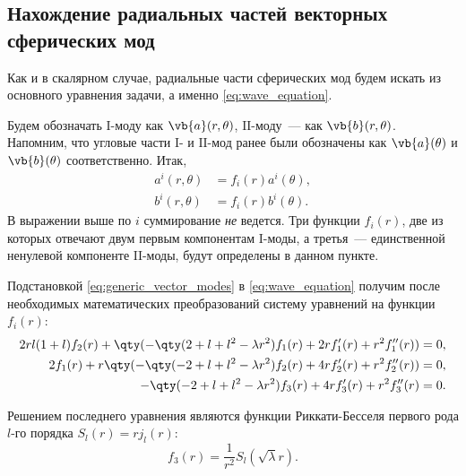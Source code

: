 %
%
%
%
%
%

\subsection{Нахождение радиальных частей векторных сферических мод}

    Как и в скалярном случае, радиальные части сферических мод будем искать из основного уравнения задачи, а именно \autoref{eq:wave_equation}.

    Будем обозначать $\mathrm{I}$-моду как $\vb{a}(r,\theta)$, $\mathrm{II}$-моду~--- как $\vb{b}(r,\theta)$. Напомним, что угловые части $\mathrm{I}$- и $\mathrm{II}$-мод ранее были обозначены как $\vb{a}(\theta)$ и $\vb{b}(\theta)$ соответственно. Итак,
    \begin{equation}\begin{aligned}\label{eq:generic_vector_modes}
        a^i(r,\theta) &= f_i(r) a^i(\theta), \\
        b^i(r,\theta) &= f_i(r) b^i(\theta).
    \end{aligned}\end{equation}
    В выражении выше по $i$ суммирование \textit{не} ведется. Три функции $f_i(r)$, две из которых отвечают двум первым компонентам $\mathrm{I}$-моды, а третья~--- единственной ненулевой компоненте $\mathrm{II}$-моды, будут определены в данном пункте.

    Подстановкой \autoref{eq:generic_vector_modes} в \autoref{eq:wave_equation} получим после необходимых математических преобразований систему уравнений на функции $f_i(r)$:
    \begin{equation}\begin{aligned}
        2 r l (1 + l) f_2(r) + \qty(
            - \qty(2 + l + l^2 - \lambda r^2) f_1(r) +
            2 r f_1'(r) + r^2 f_1''(r)
        ) &= 0, \\
        2 f_1(r) + r \qty(
            - \qty(-2 + l + l^2 - \lambda r^2) f_2(r) +
            4 r f_2'(r) + r^2 f_2''(r)
        ) &= 0, \\
        - \qty(-2 + l + l^2 - \lambda r^2) f_3(r) +
            4 r f_3'(r) + r^2 f_3''(r) &= 0.
    \end{aligned}\end{equation}

    Решением последнего уравнения являются функции Риккати-Бесселя первого рода $l$-го порядка $S_l(r) = r j_l(r)$:
    \begin{equation}
        f_3(r) = \frac{1}{r^2} S_l(\sqrt\lambda r).
    \end{equation}

